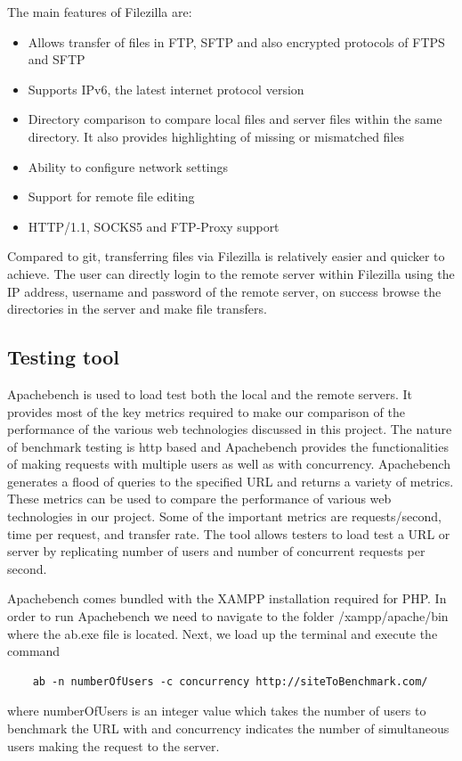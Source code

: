 \documentclass[../thesis.tex]{subfiles}
\begin{document}
	The main features of Filezilla are:
	\begin{itemize}
		\item Allows transfer of files in FTP, SFTP and also encrypted protocols of FTPS and SFTP
		\smallskip
		\item Supports IPv6, the latest internet protocol version
		\smallskip
		\item Directory comparison to compare local files and server files within the same directory. It also provides highlighting of missing or mismatched files
		\smallskip
		\item Ability to configure network settings
		\smallskip
		\item Support for remote file editing
		\smallskip
		\item HTTP/1.1, SOCKS5 and FTP-Proxy support
	\end{itemize}

	Compared to git, transferring files via Filezilla is relatively easier and quicker to achieve. The user can directly login to the remote server within Filezilla using the IP address, username and password of the remote server, on success browse the directories in the server and make file transfers.
	\subsection{Testing tool}
	Apachebench is used to load test both the local and the remote servers. It provides most of the key metrics required to make our comparison of the performance of the various web technologies discussed in this project. The nature of benchmark testing is http based and Apachebench provides the functionalities of making requests with multiple users as well as with concurrency. Apachebench generates a flood of queries to the specified URL and returns a variety of metrics. These metrics can be used to compare the performance of various web technologies in our project. Some of the important metrics are requests/second, time per request, and transfer rate. The tool allows testers to load test a URL or server by replicating number of users and number of concurrent requests per second.
	\newline
	
	Apachebench comes bundled with the XAMPP installation required for PHP. In order to run Apachebench we need to navigate to the folder /xampp/apache/bin where the ab.exe file is located. Next, we load up the terminal and execute the command 
	\begin{verbatim}
	ab -n numberOfUsers -c concurrency http://siteToBenchmark.com/
	\end{verbatim}
	where numberOfUsers is an integer value which takes the number of users to benchmark the URL with and concurrency indicates the number of simultaneous users making the request to the server.
\end{document}
